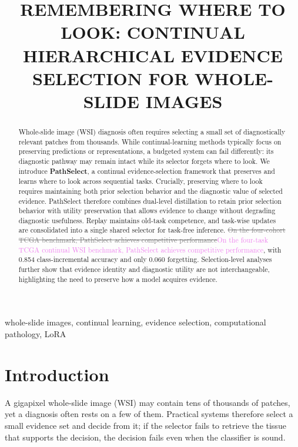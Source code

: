 \documentclass{article}
\title{REMEMBERING WHERE TO LOOK: CONTINUAL HIERARCHICAL EVIDENCE SELECTION FOR WHOLE-SLIDE IMAGES}
\newif\ifmarkup \markuptrue
\newcommand{\repc}[3]{\ifmarkup\textcolor{gray}{\sout{#2}}\textcolor{#1}{#3}\else#3\fi}
\newcommand{\repP}[2]{\repc{violet}{#1}{#2}}  %
\begin{document}
\ninept
\maketitle

\begin{abstract}
Whole-slide image (WSI) diagnosis often requires selecting a small set of diagnostically relevant patches from thousands. While continual-learning methods typically focus on preserving predictions or representations, a budgeted system can fail differently: its diagnostic pathway may remain intact while its selector forgets where to look. We introduce \textbf{PathSelect}, a continual evidence-selection framework that preserves and learns where to look across sequential tasks. Crucially, preserving where to look requires maintaining both prior selection behavior and the diagnostic value of selected evidence. PathSelect therefore combines dual-level distillation to retain prior selection behavior with utility preservation that allows evidence to change without degrading diagnostic usefulness. Replay maintains old-task competence, and task-wise updates are consolidated into a single shared selector for task-free inference. \repP{On the four-cohort TCGA benchmark, PathSelect achieves competitive performance}{On the four-task TCGA continual WSI benchmark, PathSelect achieves competitive performance}, with 0.854 class-incremental accuracy and only 0.060 forgetting. Selection-level analyses further show that evidence identity and diagnostic utility are not interchangeable, highlighting the need to preserve how a model acquires evidence.
\end{abstract}

\begin{keywords}
whole-slide images, continual learning, evidence selection, computational pathology, LoRA
\end{keywords}

\section{Introduction}
\label{sec:intro}

A gigapixel whole-slide image (WSI) may contain tens of thousands of patches, yet a diagnosis often rests on a few of them. Practical systems therefore select a small evidence set and decide from it; if the selector fails to retrieve the tissue that supports the decision, the decision fails even when the classifier is sound.
\end{document}
